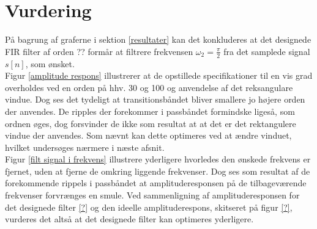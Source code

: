 \section{Vurdering}
På bagrung af graferne i sektion \ref{resultater} kan det konkluderes at det designede FIR filter af orden ?? formår at filtrere frekvensen $\omega_2=\frac{\pi}{2}$ fra det samplede signal $s[n]$, som ønsket.\\
Figur \ref{amplitude respons} illustrerer at de opstillede specifikationer til en vis grad overholdes ved en orden på hhv. 30 og 100 og anvendelse af det reksangulare vindue. Dog ses det tydeligt at transitionsbåndet bliver smallere jo højere orden der anvendes. De ripples der forekommer i passbåndet formindske ligeså, som ordnen øges, dog forsvinder de ikke som resultat at at det er det rektangulere vindue der anvendes. Som nævnt kan dette optimeres ved at ændre vinduet, hvilket undersøges nærmere i næste afsnit. \\
Figur \ref{filt signal i frekvens} illustrere yderligere hvorledes den ønskede frekvens er fjernet, uden at fjerne de omkring liggende frekvenser. Dog ses som resultat af de forekommende  rippels i passbåndet at amplituderesponsen på de tilbageværende frekvenser forvrænges en smule.    
Ved sammenligning af amplituderesponsen for det designede filter \ref{?} og den ideelle amplituderespons, skitseret på figur \ref{?}, vurderes det altså at det designede filter kan optimeres yderligere. \\
          